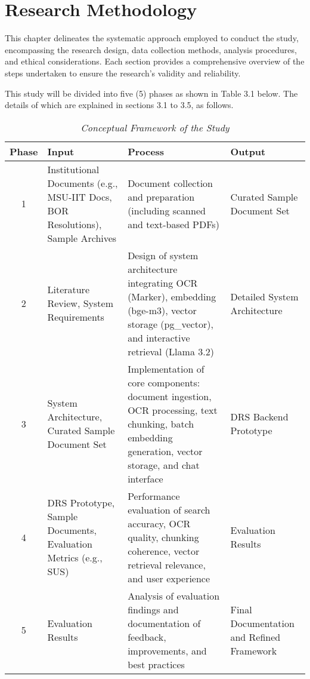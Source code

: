 \chapter{Research Methodology}

\noindent This chapter delineates the systematic approach employed to conduct the study, encompassing the research design, data collection methods, analysis procedures, and ethical considerations. Each section provides a comprehensive overview of the steps undertaken to ensure the research's validity and reliability.

\noindent This study will be divided into five (5) phases as shown in Table 3.1 below. The details of which are explained in sections 3.1 to 3.5, as follows.

\begin{table}[ht]
    \centering
    \renewcommand{\arraystretch}{1.5}
    \begin{tabular}{|c|p{4cm}|p{5cm}|p{4cm}|}
        \hline
        \textbf{Phase} & \textbf{Input} & \textbf{Process} & \textbf{Output} \\
        \hline
        1 & Institutional Documents (e.g., MSU-IIT Docs, BOR Resolutions), Sample Archives & Document collection and preparation (including scanned and text-based PDFs) & Curated Sample Document Set \\
        \hline
        2 & Literature Review, System Requirements & Design of system architecture integrating OCR (Marker), embedding (bge-m3), vector storage (pg\_vector), and interactive retrieval (Llama 3.2) & Detailed System Architecture \\
        \hline
        3 & System Architecture, Curated Sample Document Set & Implementation of core components: document ingestion, OCR processing, text chunking, batch embedding generation, vector storage, and chat interface & DRS Backend Prototype \\
        \hline
        4 & DRS Prototype, Sample Documents, Evaluation Metrics (e.g., SUS) & Performance evaluation of search accuracy, OCR quality, chunking coherence, vector retrieval relevance, and user experience & Evaluation Results \\
        \hline
        5 & Evaluation Results & Analysis of evaluation findings and documentation of feedback, improvements, and best practices & Final Documentation and Refined Framework \\
        \hline
    \end{tabular}
    \caption{\textit{Conceptual Framework of the Study}}
    \label{tab:conceptual-framework}
\end{table}


